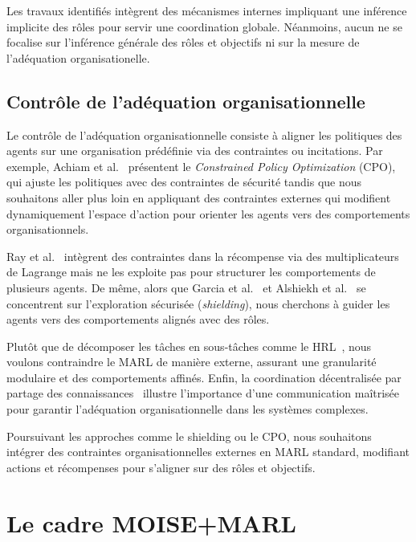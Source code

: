 \documentclass[dissemination]{jfsma}
\begin{document}
Les travaux identifiés intègrent des mécanismes internes impliquant une inférence  implicite des rôles pour servir une coordination globale. Néanmoins, aucun ne se focalise sur l'inférence générale des rôles et objectifs ni sur la mesure de l'adéquation organisationelle.

\subsection{Contrôle de l'adéquation organisationnelle}

Le contrôle de l'adéquation organisationnelle consiste à aligner les politiques des agents sur une organisation prédéfinie via des contraintes ou incitations. Par exemple, Achiam et al.~\cite{achiam2017cpo} présentent le \textit{Constrained Policy Optimization} (CPO), qui ajuste les politiques avec des contraintes de sécurité tandis que nous souhaitons aller plus loin en appliquant des contraintes externes qui modifient dynamiquement l'espace d'action pour orienter les agents vers des comportements organisationnels.

Ray et al.~\cite{ray2019benchmarking} intègrent des contraintes dans la récompense via des multiplicateurs de Lagrange mais ne les exploite pas pour structurer les comportements de plusieurs agents. De même, alors que Garcia et al.~\cite{garcia2015comprehensive} et Alshiekh et al.~\cite{alshiekh2018safe} se concentrent sur l'exploration sécurisée (\textit{shielding}), nous cherchons à guider les agents vers des comportements alignés avec des rôles.

Plutôt que de décomposer les tâches en sous-tâches comme le HRL~\cite{ghavamzadeh2006hrl}, nous voulons contraindre le MARL de manière externe, assurant une granularité modulaire et des comportements affinés. Enfin, la coordination décentralisée par partage des connaissances~\cite{foerster2018communication} illustre l'importance d'une communication maîtrisée pour garantir l'adéquation organisationnelle dans les systèmes complexes.

Poursuivant les approches comme le shielding ou le CPO, nous souhaitons intégrer des contraintes organisationnelles externes en MARL standard, modifiant actions et récompenses pour s'aligner sur des rôles et objectifs.


\section{Le cadre MOISE+MARL}
\label{sec:moise_marl_framework}
\end{document}
